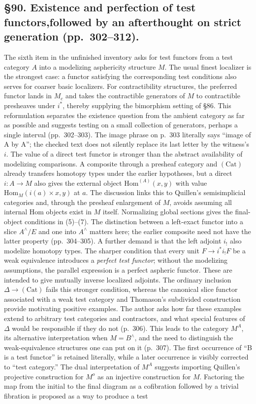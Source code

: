 \documentclass[10pt,oneside]{book}
\begin{document}
\subsection*{\S90. Existence and perfection of test functors,\newline followed by an afterthought on strict generation (pp.\ 302--312).}
The sixth item in the unfinished inventory asks for test functors from a test category $A$ into a modelizing asphericity structure $M$. The usual finest localizer is the strongest case: a functor satisfying the corresponding test conditions also serves for coarser basic localizers. For contractibility structures, the preferred functor lands in $M_c$ and takes the contractible generators of $M$ to contractible presheaves under $i^*$, thereby supplying the bimorphism setting of \S86. This reformulation separates the existence question from the ambient category as far as possible and suggests testing on a small collection of generators, perhaps a single interval (pp.\ 302--303). The image phrase on p.\ 303 literally says “image of A by A”; the checked text does not silently replace its last letter by the witness's $i$. The value of a direct test functor is stronger than the abstract availability of modelizing comparisons. A composite through a presheaf category and $(\mathrm{Cat})$ already transfers homotopy types under the earlier hypotheses, but a direct $i:A\to M$ also gives the external object $\mathrm{Hom}^{(A)}(x,y)$ with value $\mathrm{Hom}_M(i(a)\times x,y)$ at $a$. The discussion links this to Quillen's semisimplicial categories and, through the presheaf enlargement of $M$, avoids assuming all internal Hom objects exist in $M$ itself. Normalizing global sections gives the final-object conditions in (5)--(7). The distinction between a left-exact functor into a slice $A^\wedge/E$ and one into $A^\wedge$ matters here; the earlier composite need not have the latter property (pp.\ 304--305). A further demand is that the left adjoint $i_!$ also modelize homotopy types. The sharper condition that every unit $F\to i^*i_!F$ be a weak equivalence introduces a \emph{perfect test functor}; without the modelizing assumptions, the parallel expression is a perfect aspheric functor. These are intended to give mutually inverse localized adjoints. The ordinary inclusion $\Delta\to(\mathrm{Cat})$ fails this stronger condition, whereas the canonical slice functor associated with a weak test category and Thomason's subdivided construction provide motivating positive examples. The author asks how far these examples extend to arbitrary test categories and contractors, and what special features of $\Delta$ would be responsible if they do not (p.\ 306). This leads to the category $M^A$, its alternative interpretation when $M=B^\wedge$, and the need to distinguish the weak-equivalence structures one can put on it (p.\ 307). The first occurrence of “B is a test functor” is retained literally, while a later occurrence is visibly corrected to “test category.” The dual interpretation of $M^A$ suggests importing Quillen's projective construction for $M^o$ as an injective construction for $M$. Factoring the map from the initial to the final diagram as a cofibration followed by a trivial fibration is proposed as a way to produce a test 
\end{document}
